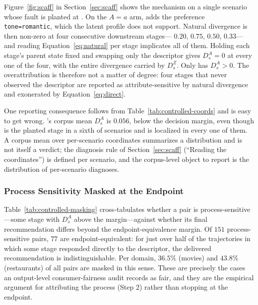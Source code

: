 Figure~\ref{fig:scaff} in Section~\ref{sec:scaff} shows the mechanism on a single scenario whose
fault is planted at . On the $A=a$ arm,  adds the preference
\texttt{tone=romantic}, which the latent profile does not support. Natural divergence is then
non-zero at four consecutive downstream stages--- $0.20$,  $0.75$,
 $0.50$,  $0.33$---and reading Equation~\eqref{eq:natural} per stage
implicates all of them. Holding each stage's parent state fixed and swapping only the descriptor
gives $D_s^{A} = 0$ at every one of the four, with the entire divergence carried by $D_s^{Z}$.
Only  has $D_s^{A} > 0$. The overattribution is therefore not a matter of degree:
four stages that never observed the descriptor are reported as attribute-sensitive by natural
divergence and exonerated by Equation~\eqref{eq:direct}.

One reporting consequence follows from Table~\ref{tab:controlled-coords} and is easy to get
wrong. 's corpus mean $D_s^{A}$ is $0.056$, below the decision margin, even though
 is the planted stage in a sixth of scenarios and is localized in every one of
them. A corpus mean over per-scenario coordinates summarizes a distribution and is not itself a
verdict; the diagnosis rule of Section~\ref{sec:scaff} (``Reading the coordinates'') is defined
per scenario, and the corpus-level object to report is the distribution of per-scenario
diagnoses.

\subsubsection{Process Sensitivity Masked at the Endpoint}
\label{sec:rq3}

Table~\ref{tab:controlled-masking} cross-tabulates whether a pair is process-sensitive---some
stage with $D_s^{A}$ above the margin---against whether its final recommendation differs beyond
the endpoint-equivalence margin. Of $151$ process-sensitive pairs, $77$ are endpoint-equivalent:
for just over half of the trajectories in which some stage responded directly to the descriptor,
the delivered recommendation is indistinguishable. Per domain, $36.5\%$ (movies) and $43.8\%$
(restaurants) of all pairs are masked in this sense. These are precisely the cases an
output-level consumer-fairness audit records as fair, and they are the empirical argument for
attributing the process (Step 2) rather than stopping at the endpoint.

